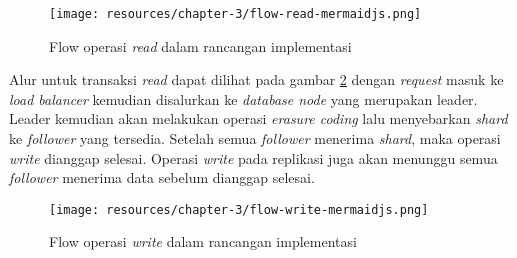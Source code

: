 \begin{figure}[!ht]
    \centering
    \texttt{[image: resources/chapter-3/flow-read-mermaidjs.png]}
    \caption{Flow operasi \textit{read} dalam rancangan implementasi}
    \label{fig:flow-read-mermaidjs}
\end{figure}

Alur untuk transaksi \textit{read} dapat dilihat pada gambar \ref{fig:flow-write-mermaidjs} dengan \textit{request} masuk ke \textit{load balancer} kemudian disalurkan ke \textit{database node} yang merupakan leader. Leader kemudian akan melakukan operasi \textit{erasure coding} lalu menyebarkan \textit{shard} ke \textit{follower} yang tersedia. Setelah semua \textit{follower} menerima \textit{shard}, maka operasi \textit{write} dianggap selesai. Operasi \textit{write} pada replikasi juga akan menunggu semua \textit{follower} menerima data sebelum dianggap selesai. 

\begin{figure}[!ht]
    \centering
    \texttt{[image: resources/chapter-3/flow-write-mermaidjs.png]}
    \caption{Flow operasi \textit{write} dalam rancangan implementasi}
    \label{fig:flow-write-mermaidjs}
\end{figure}
